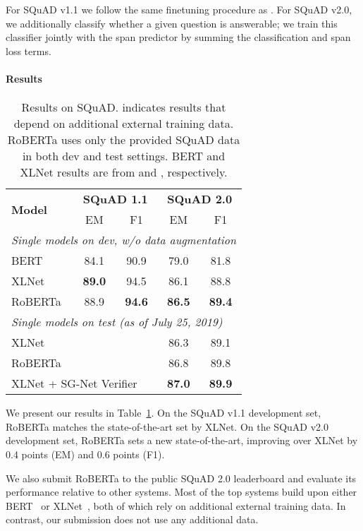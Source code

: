 \documentclass[11pt]{article}
\newcommand{\ourmodel}{RoBERTa}
\newcommand{\bertlarge}{BERT}
\newcommand{\xlnetlarge}{XLNet}
\begin{document}
For SQuAD v1.1 we follow the same finetuning procedure as .
For SQuAD v2.0, we additionally classify whether a given question is answerable; we train this classifier jointly with the span predictor by summing the classification and span loss terms.

\paragraph{Results}

\begin{table}[t]
\begin{center}
\begin{tabular}{lcccc}
\toprule
\multirow{2}{*}{\bf Model} & \multicolumn{2}{c}{\bf SQuAD 1.1} &\multicolumn{2}{c}{\bf SQuAD 2.0} \\
&  EM &  F1 &  EM &  F1  \\
\midrule
\multicolumn{5}{l}{\textit{Single models on dev, w/o data augmentation}}\\
\bertlarge{} &  84.1&90.9&79.0&81.8\\
\xlnetlarge{} &\bf{89.0}& 94.5&86.1&88.8\\
\ourmodel{} & 88.9 & \bf{94.6} & \bf{86.5} &\bf{89.4}\\
\midrule
\multicolumn{5}{l}{\textit{Single models on test (as of July 25, 2019)}}\\
\multicolumn{3}{l}{\xlnetlarge{}} & 86.3 & 89.1 \\
\multicolumn{3}{l}{\ourmodel{}} & 86.8 & 89.8 \\
\multicolumn{3}{l}{XLNet + SG-Net Verifier} & \textbf{87.0} & \textbf{89.9} \\
\bottomrule
\end{tabular}
\end{center}
\caption{
Results on SQuAD.
 indicates results that depend on additional external training data.
\ourmodel{} uses only the provided SQuAD data in both dev and test settings.
BERT and XLNet results are from  and , respectively.
}
\label{tab:roberta_squad}
\end{table} 
We present our results in Table~\ref{tab:roberta_squad}.
On the SQuAD v1.1 development set, \ourmodel{} matches the state-of-the-art set by XLNet.
On the SQuAD v2.0 development set, \ourmodel{} sets a new state-of-the-art, improving over XLNet by 0.4 points (EM) and 0.6 points (F1).

We also submit \ourmodel{} to the public SQuAD 2.0 leaderboard and evaluate its performance relative to other systems.
Most of the top systems build upon either BERT~\cite{devlin2018bert} or XLNet~\cite{yang2019xlnet}, both of which rely on additional external training data.
In contrast, our submission does not use any additional data.
\end{document}
